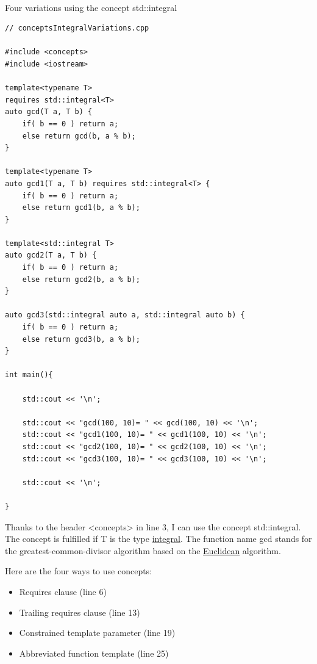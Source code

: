 \hspace*{\fill} \\ %
\noindent
Four variations using the concept std::integral
\begin{lstlisting}[style=styleCXX]
// conceptsIntegralVariations.cpp

#include <concepts>
#include <iostream>

template<typename T>
requires std::integral<T>
auto gcd(T a, T b) {
	if( b == 0 ) return a;
	else return gcd(b, a % b);
}

template<typename T>
auto gcd1(T a, T b) requires std::integral<T> {
	if( b == 0 ) return a;
	else return gcd1(b, a % b);
}

template<std::integral T>
auto gcd2(T a, T b) {
	if( b == 0 ) return a;
	else return gcd2(b, a % b);
}

auto gcd3(std::integral auto a, std::integral auto b) {
	if( b == 0 ) return a;
	else return gcd3(b, a % b);
}

int main(){

	std::cout << '\n';
	
	std::cout << "gcd(100, 10)= " << gcd(100, 10) << '\n';
	std::cout << "gcd1(100, 10)= " << gcd1(100, 10) << '\n';
	std::cout << "gcd2(100, 10)= " << gcd2(100, 10) << '\n';
	std::cout << "gcd3(100, 10)= " << gcd3(100, 10) << '\n';
	
	std::cout << '\n';

}
\end{lstlisting}

Thanks to the header <concepts> in line 3, I can use the concept std::integral. The concept is fulfilled if T is the type \href{https://en.cppreference.com/w/cpp/types/is_integral}{integral}. The function name gcd stands for the greatest-common-divisor algorithm based on the \href{https://en.wikipedia.org/wiki/Euclid}{Euclidean} algorithm.

Here are the four ways to use concepts:

\begin{itemize}
\item 
Requires clause (line 6)

\item 
Trailing requires clause (line 13)

\item 
Constrained template parameter (line 19)

\item 
Abbreviated function template (line 25)
\end{itemize}

